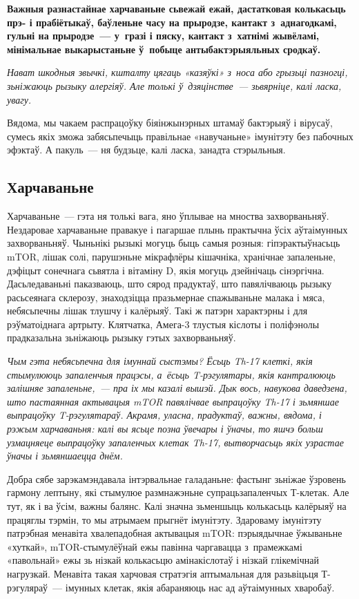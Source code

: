 \textbf{Важныя разнастайнае харчаваньне сьвежай ежай, дастатковая колькасьць прэ- і прабіётыкаў, баўленьне часу на прыродзе, кантакт з~аднагодкамі, гульні на прыродзе~--- у~гразі і пяску, кантакт з~хатнімі жывёламі, мінімальнае выкарыстаньне ў~побыце антыбактэрыяльных сродкаў.}

\emph{Нават шкодныя звычкі, кшталту цягаць «казяўкі» з~носа або грызьці пазногці, зьніжаюць рызыку алергіяў. Але толькі ў~дзяцінстве~--- зьвярніце, калі ласка, увагу.}

Вядома, мы чакаем распрацоўку біяінжынэрных штамаў бактэрыяў і вірусаў, сумесь якіх зможа забясьпечыць правільнае «навучаньне» імунітэту без пабочных эфэктаў. А пакуль~--- ня будзьце, калі ласка, занадта стэрыльныя.

\subsection*{Харчаваньне}

Харчаваньне~--- гэта ня толькі вага, яно ўплывае на мноства захворваньняў. Нездаровае харчаваньне правакуе і пагаршае плынь практычна ўсіх аўтаімунных захворваньняў. Чыньнікі рызыкі могуць быць самыя розныя: гіпэрактыўнасьць mTOR, лішак солі, парушэньне мікрафлёры кішачніка, хранічнае запаленьне, дэфіцыт сонечнага сьвятла і вітаміну D, якія могуць дзейнічаць сінэргічна. Дасьледаваньні паказваюць, што сярод прадуктаў, што павялічваюць рызыку расьсеянага склерозу, знаходзіцца празьмернае спажываньне малака і мяса, небясьпечны лішак тлушчу і калёрыяў. Такі ж патэрн характэрны і для рэўматоіднага артрыту. Клятчатка, Амега-3 тлустыя кіслоты і поліфэнолы прадказальна зьніжаюць рызыку гэтых захворваньняў. 


\emph{Чым гэта небясьпечна для імуннай сыстэмы? Ёсьць Th-17 клеткі, якія стымулююць запаленчыя працэсы, а~ёсьць T-рэгулятары, якія кантралююць залішняе запаленьне,~--- пра іх мы казалі вышэй. Дык вось, навукова даведзена, што пастаянная актывацыя mTOR павялічвае выпрацоўку Th-17 і зьмяншае выпрацоўку T-рэгулятараў. Акрамя, уласна, прадуктаў, важны, вядома, і рэжым харчаваньня: калі вы ясьце позна ўвечары і ўначы, то яшчэ больш узмацняеце выпрацоўку запаленчых клетак Th-17, вытворчасьць якіх узрастае ўначы і зьмяншаецца днём.}

Добра сябе зарэкамэндавала інтэрвальнае галаданьне: фастынг зьніжае ўзровень гармону лептыну, які стымулюе размнажэньне супрацьзапаленчых Т-клетак. Але тут, як і ва ўсім, важны балянс. Калі значна зьменшыць колькасьць калёрыяў на працяглы тэрмін, то мы атрымаем прыгнёт імунітэту. Здароваму імунітэту патрэбная менавіта хвалепадобная актывацыя mTOR: пэрыядычнае ўжываньне «хуткай», mTOR-стымулёўнай ежы павінна чаргавацца з~прамежкамі «павольнай» ежы зь нізкай колькасьцю амінакіслотаў і нізкай глікемічнай нагрузкай. Менавіта такая харчовая стратэгія аптымальная для разьвіцьця Т-рэгуляраў~--- імунных клетак, якія абараняюць нас ад аўтаімунных хваробаў.

